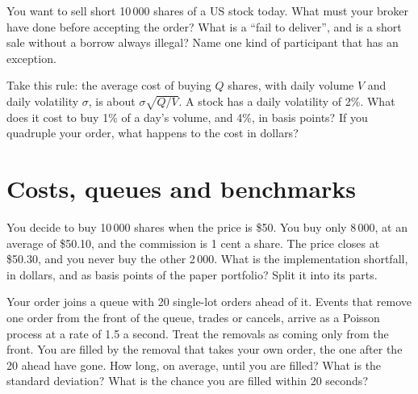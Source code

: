 \begin{question}\label{iq:iv2:markets-and-microstructure:14}
You want to sell short 10\,000 shares of a US stock today. What must your broker have done before accepting the order? What is a ``fail to deliver'', and is a short sale without a borrow always illegal? Name one kind of participant that has an exception.
\end{question}

\begin{question}\label{iq:iv2:markets-and-microstructure:15}
Take this rule: the average cost of buying $Q$ shares, with daily volume $V$ and daily volatility $\sigma$, is about $\sigma\sqrt{Q/V}$. A stock has a daily volatility of 2\%. What does it cost to buy 1\% of a day's volume, and 4\%, in basis points? If you quadruple your order, what happens to the cost in dollars?
\end{question}

\section{Costs, queues and benchmarks}

\begin{question}\label{iq:iv2:markets-and-microstructure:16}
You decide to buy 10\,000 shares when the price is \$50. You buy only 8\,000, at an average of \$50.10, and the commission is 1 cent a share. The price closes at \$50.30, and you never buy the other 2\,000. What is the implementation shortfall, in dollars, and as basis points of the paper portfolio? Split it into its parts.
\end{question}

\begin{question}\label{iq:iv2:markets-and-microstructure:17}
Your order joins a queue with 20 single-lot orders ahead of it. Events that remove one order from the front of the queue, trades or cancels, arrive as a Poisson process at a rate of 1.5 a second. Treat the removals as coming only from the front. You are filled by the removal that takes your own order, the one after the 20 ahead have gone. How long, on average, until you are filled? What is the standard deviation? What is the chance you are filled within 20 seconds?
\end{question}

